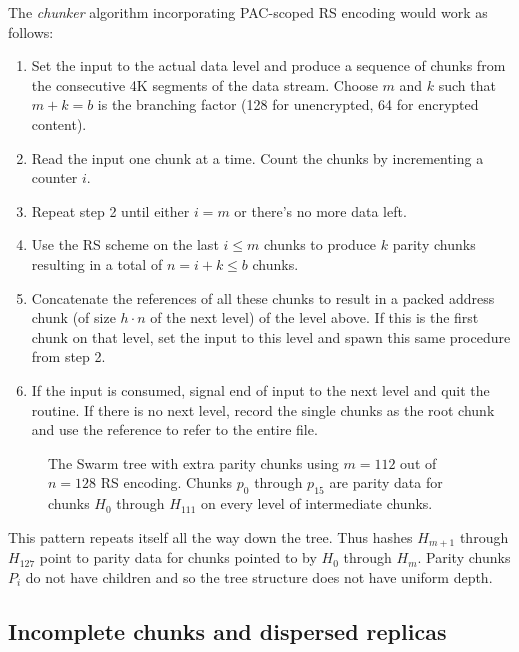 The \emph{chunker} algorithm incorporating PAC-scoped RS encoding would work as follows: 

\begin{enumerate}[noitemsep]
\item Set the input to the actual data level and produce a sequence of chunks from the consecutive 4K segments of the data stream. Choose $m$ and $k$ such that $m+k=b$ is the branching factor (128 for unencrypted, 64 for encrypted content).
\item Read the input one chunk at a time. Count the chunks by incrementing a counter $i$. 
\item Repeat step 2 until either $i = m$ or there's no more data left.
\item Use the RS scheme on the last $i\leq m$ chunks to produce $k$ parity chunks resulting in a total of $n = i+k \leq b$ chunks.
\item Concatenate the references of all these chunks to result in a packed address chunk (of size $h\cdot n$ of the next level) of the level above. If this is the first chunk on that level,  set the input to this level and spawn this same procedure from step 2. 
\item If the input is consumed, signal end of input to the next level and quit the routine. If there is no next level, record the single chunks as the root chunk and use the reference to refer to the entire file.
\end{enumerate}



\begin{figure}[htbp]
   \centering
   \resizebox{1\textwidth}{!}{
        
   }
   \caption[Swarm hash erasure \statusgreen]{The Swarm tree with extra parity chunks using $m=112$ out of $n=128$ RS encoding. Chunks $p_{0}$ through $p_{15}$ are parity data for chunks $H_0 $ through $H_{111}$ on every level of intermediate chunks.}
   \label{fig:Swarm-hash-erasure}
\end{figure}


This pattern repeats itself all the way down the tree. Thus hashes $H_{m+1}$ through $H_{127}$ point to parity data for chunks pointed to by $H_0$ through $H_{m}$. Parity chunks $P_i$ do not have children and so the tree structure does not have uniform depth.

\subsection{Incomplete chunks and dispersed replicas}
\label{sec:dispersed-replicas}

